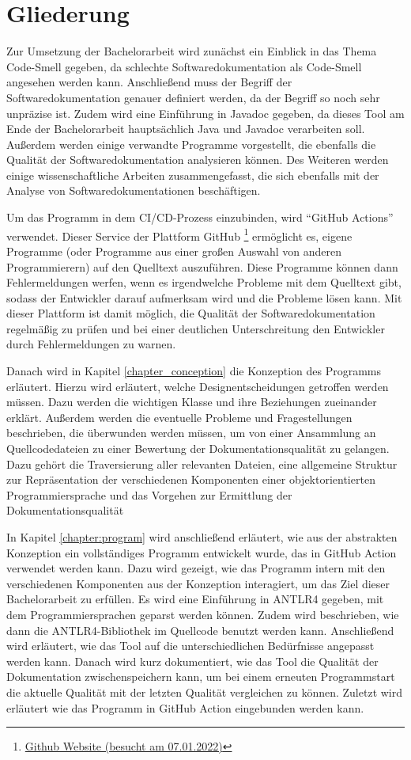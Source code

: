 \section{Gliederung}
Zur Umsetzung der Bachelorarbeit wird zunächst ein Einblick in das Thema Code-Smell  gegeben, da schlechte Softwaredokumentation als Code-Smell angesehen werden kann. Anschließend muss der Begriff der Softwaredokumentation genauer definiert werden, da der Begriff so noch sehr unpräzise ist. Zudem wird eine Einführung in Javadoc gegeben, da dieses Tool am Ende der Bachelorarbeit hauptsächlich Java und Javadoc verarbeiten soll.
Außerdem werden einige verwandte Programme vorgestellt, die ebenfalls die Qualität der Softwaredokumentation analysieren können. Des Weiteren werden einige wissenschaftliche Arbeiten zusammengefasst, die sich ebenfalls mit der Analyse von Softwaredokumentationen beschäftigen.

Um das Programm in dem \ac{CI/CD}-Prozess einzubinden, wird \enquote{GitHub Actions} verwendet. Dieser Service der Plattform GitHub \footnote{\href{https://github.com/}{Github Website (besucht am 07.01.2022)}} ermöglicht es, eigene Programme (oder Programme aus einer großen Auswahl von anderen Programmierern) auf den Quelltext auszuführen.  Diese Programme können dann Fehlermeldungen werfen, wenn es irgendwelche Probleme mit dem Quelltext gibt, sodass der Entwickler darauf aufmerksam wird und die Probleme lösen kann. Mit dieser Plattform ist damit möglich, die Qualität der Softwaredokumentation regelmäßig zu prüfen und bei einer deutlichen Unterschreitung den Entwickler durch Fehlermeldungen zu warnen.  

Danach wird in Kapitel \ref{chapter_conception} die Konzeption des Programms erläutert. Hierzu wird erläutert, welche Designentscheidungen getroffen werden müssen. Dazu werden die wichtigen Klasse und ihre Beziehungen zueinander erklärt. Außerdem werden die eventuelle Probleme und Fragestellungen beschrieben, die überwunden werden müssen, um von einer Ansammlung an Quellcodedateien zu einer Bewertung der Dokumentationsqualität zu gelangen.  Dazu gehört die Traversierung aller relevanten Dateien, eine allgemeine Struktur zur Repräsentation der verschiedenen Komponenten einer objektorientierten Programmiersprache und das Vorgehen zur Ermittlung der Dokumentationsqualität

In Kapitel \ref{chapter:program} wird anschließend erläutert, wie aus der abstrakten Konzeption ein vollständiges Programm entwickelt wurde, das in GitHub Action verwendet werden kann. Dazu wird gezeigt, wie das Programm intern mit den verschiedenen Komponenten aus der Konzeption interagiert, um das Ziel dieser Bachelorarbeit zu erfüllen. Es wird eine Einführung in ANTLR4 gegeben, mit dem Programmiersprachen geparst werden können. Zudem wird beschrieben, wie dann die ANTLR4-Bibliothek im Quellcode benutzt werden kann. Anschließend wird erläutert, wie das Tool auf die unterschiedlichen Bedürfnisse angepasst werden kann. Danach wird kurz dokumentiert, wie das Tool die Qualität der Dokumentation zwischenspeichern kann, um bei einem erneuten Programmstart die aktuelle Qualität mit der letzten Qualität vergleichen zu können. Zuletzt wird erläutert wie das Programm in GitHub Action eingebunden werden kann.   

